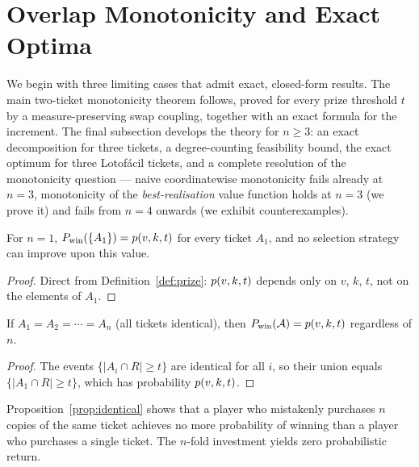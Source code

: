 
\section{Overlap Monotonicity and Exact Optima}
\label{sec:theory}

We begin with three limiting cases that admit exact, closed-form results.
The main two-ticket monotonicity theorem follows, proved for every prize
threshold $t$ by a measure-preserving swap coupling, together with an exact
formula for the increment.  The final subsection develops the theory for
$n \ge 3$: an exact decomposition for three tickets, a degree-counting
feasibility bound, the exact optimum for three Lotof\'{a}cil tickets, and a
complete resolution of the monotonicity question --- naive coordinatewise
monotonicity fails already at $n = 3$, monotonicity of the
\emph{best-realisation} value function holds at $n = 3$ (we prove it) and
fails from $n = 4$ onwards (we exhibit counterexamples).

\begin{proposition}
  \label{prop:n1}
  For $n = 1$, $P_{\mathrm{win}}(\{A_1\}) = p(v,k,t)$ for every ticket $A_1$, and no
  selection strategy can improve upon this value.
\end{proposition}

\begin{proof}
  Direct from Definition~\ref{def:prize}: $p(v,k,t)$ depends only on $v$, $k$,
  $t$, not on the elements of $A_1$.
\end{proof}

\begin{proposition}
  \label{prop:identical}
  If $A_1 = A_2 = \cdots = A_n$ (all tickets identical), then
  $P_{\mathrm{win}}(\mathcal{A}) = p(v,k,t)$ regardless of $n$.
\end{proposition}

\begin{proof}
  The events $\{|A_i \cap R| \ge t\}$ are identical for all $i$, so their
  union equals $\{|A_1 \cap R| \ge t\}$, which has probability $p(v,k,t)$.
\end{proof}

\begin{remark}
  Proposition~\ref{prop:identical} shows that a player who mistakenly
  purchases $n$ copies of the same ticket achieves no more probability of
  winning than a player who purchases a single ticket.  The $n$-fold
  investment yields zero probabilistic return.
\end{remark}

